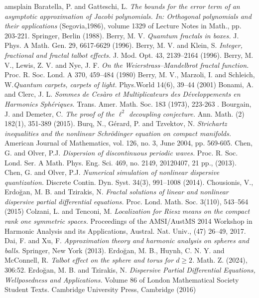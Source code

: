 \documentclass[12pt]{amsart}
\theoremstyle{definition}
\numberwithin{equation}{section}
\begin{document}
\begin{thebibliography}{amsplain}
 Baratella, P. and Gatteschi, L. {\em The bounds for the error term of an asymptotic approximation of Jacobi polynomials. In: Orthogonal polynomials and their applications} (Segovia,1986), volume 1329 of Lecture Notes in Math., pp. 203-221. Springer, Berlin (1988).
 Berry, M. V. {\em Quamtum fractals in boxes.} J. Phys. A Math. Gen. 29, 6617-6629 (1996).
 Berry, M. V. and Klein, S. {\em Integer, fractional and fractal talbot effects.} J. Mod. Opt. 43, 2139–2164 (1996).
 Berry, M. V., Lewis, Z. V. and Nye, J. F. {\em On the Weierstrass–Mandelbrot fractal function.} Proc. R. Soc. Lond. A 370, 459–484 (1980)
 Berry, M. V., Marzoli, I. and Schleich, W.{\em Quantum carpets, carpets of light.} Phys.World 14(6), 39–44 (2001)
 Bonami, A. and Clerc, J. L. {\em Sommes de Ces\`aro et Multiplicateurs des D\'eveloppements en Harmonics Sph\'eriques.} Trans. Amer. Math. Soc. 183 (1973), 223-263 .
 Bourgain, J. and Demeter, C. {\em The proof of the $\ell^2$ decoupling conjecture.} Ann. Math. (2) 182(1), 351-389 (2015).
 Burq, N., G\'erard, P. and Tzvektov, N. {\em Strichartz inequalities and the nonlinear Schr\"odinger equation on compact manifolds.} American Journal of Mathematics, vol. 126, no. 3, June 2004, pp. 569-605.
 Chen, G. and Olver, P.J. {\em Dispersion of discontinuous periodic waves.} Proc. R. Soc. Lond. Ser. A Math. Phys. Eng. Sci. 469, no. 2149, 20120407, 21 pp., (2013).
 Chen, G. and Olver, P.J. {\em Numerical simulation of nonlinear dispersive quantization.} Discrete Contin. Dyn. Syst. 34(3), 991–1008 (2014).
 Chousionis, V., Erdo\u{g}an, M. B. and Tzirakis, N. {\em Fractal solutions of linear and nonlinear dispersive partial differential equations.} Proc. Lond. Math. Soc. 3(110), 543–564 (2015)
 Colzani, L. and Tenconi, M. {\em 
Localization for Riesz means on the compact rank one symmetric spaces.} Proceedings of the AMSI/AustMS 2014 Workshop in Harmonic Analysis and its Applications, Austral. Nat. Univ., (47) 26–49,  2017.
 Dai, F. and Xu, F. {\em Approximation theory and harmonic analysis on spheres and balls.} Springer, New York (2013). 
 Erdo\u{g}an, M. B., Huynh, C. N. Y. and McConnell, R. {\em Talbot effect on the sphere and torus for $d\ge 2$.} Math. Z. (2024), 306:52.
 Erdo\u{g}an, M. B. and Tzirakis, N. {\em Dispersive Partial Differential Equations, Wellposedness and Applications.} Volume 86 of London Mathematical Society Student Texts. Cambridge University Press, Cambridge (2016) 

\end{thebibliography}
\end{document}
